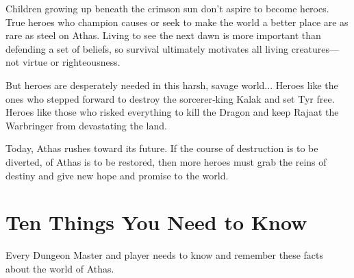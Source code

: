 \documentclass[10pt,a4paper,twocolumn]{d20}
\begin{document}
Children growing up beneath the crimson sun don’t aspire to become heroes. True heroes who champion causes or seek to make the world a better place are as rare as steel on Athas. Living to see the next dawn is more important than defending a set of beliefs, so survival ultimately motivates all living creatures---not virtue or righteousness.

But heroes are desperately needed in this harsh, savage world... Heroes like the ones who stepped forward to destroy the sorcerer‐king Kalak and set Tyr free. Heroes like those who risked everything to kill the Dragon and keep Rajaat the Warbringer from devastating the land.

Today, Athas rushes toward its future. If the course of destruction is to be diverted, of Athas is to be restored, then more heroes must grab the reins of destiny and give new hope and promise to the world.

\section{Ten Things You Need to Know}

Every Dungeon Master and player needs to know and remember these facts about the world of Athas.
\end{document}
